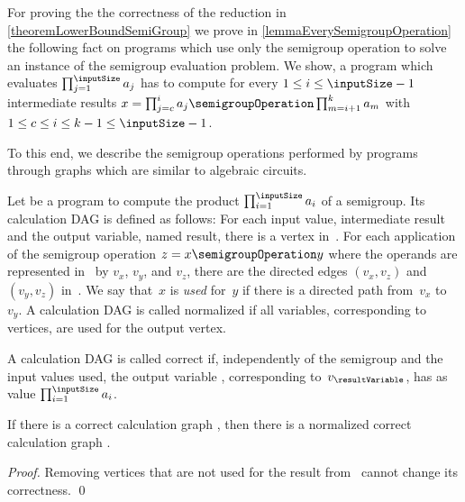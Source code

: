 \documentclass[envcountsame]{llncs}
\begin{document}
For proving the the correctness of the reduction in \autoref{theoremLowerBoundSemiGroup} we prove in \autoref{lemmaEverySemigroupOperation} the following fact on programs which use only the semigroup operation to solve an instance of the semigroup evaluation problem.
We show, a program which evaluates $\prod_{j=1}^{\inputSize}a_j$ has to compute for every $1\leq i \leq \inputSize-1$ intermediate results $x=\prod_{j=c}^{i}a_j\semigroupOperation\prod_{m=i+1}^{k}a_m$ with $1\leq c\leq i \leq k -1 \leq \inputSize-1$. 

To this end, we describe the semigroup operations performed by programs through graphs which are similar to algebraic circuits.


\begin{definition}
Let \program be a program to compute the product $\prod_{i=1}^{\inputSize}a_i$ of a semigroup.
Its calculation DAG \calculationDAGof{\program} is defined as follows: 
For each input value, intermediate result and the output variable, named result, there is a vertex in~\calculationDAGof{\program}.
For each application of the semigroup operation $z=x\semigroupOperation y$ where the operands are represented in~\calculationDAGof{\program} by $v_x$, $v_y$, and $v_z$, there are the directed edges $(v_x,v_z)$ and  $(v_y,v_z)$ in~\calculationDAGof{\program}.
We say that~$x$ is \emph{used} for~$y$ if there is a directed path from~$v_x$ to~$v_y$.
A calculation DAG is called normalized if all variables, corresponding to vertices, are used for the output vertex.

A calculation DAG \calculationDAG is called correct if, independently of the semigroup and the input values used, the output variable \resultVariable, corresponding to~$v_{\resultVariable}$, has as value $\prod_{i=1}^{\inputSize}a_i$.
\end{definition}

\begin{lemma}
If there is a correct calculation graph \calculationDAGof{\program}, then there is a normalized correct calculation graph \calculationDAG.
\end{lemma}
\begin{proof}
Removing vertices that are not used for the result from~\calculationDAGof{\program} cannot change its correctness. 
\qed
\end{proof}
\end{document}
